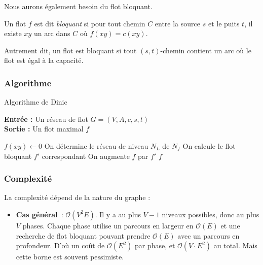 \documentclass[a4paper]{article}
\begin{document}
Nous aurons également besoin du flot bloquant.
\begin{definition}
	Un flot $f$ est dit \emph{bloquant} si pour tout chemin $C$ entre la source $s$ et le puits $t$, il existe $xy$ un arc dans $C$ où $f(xy)=c(xy)$.

	Autrement dit, un flot est bloquant si tout $(s,t)$-chemin contient un arc où le flot est égal à la capacité.
\end{definition}

\subsubsection{Algorithme}

\begin{algorithm}[H]
	\caption{Algorithme de Dinic}
	\textbf{Entrée :} Un réseau de flot $G = (V, A, c, s, t)$ \\
	\textbf{Sortie :} Un flot maximal $f$
	\begin{algorithmic}[1]
		\State $f(xy) \gets 0$
		\EndFor
		\State On détermine le réseau de niveau $N_L$ de $N_f$ 
		\State On calcule le flot bloquant $f'$ correspondant
		\State On augmente $f$ par $f'$
		\EndWhile
		\State \Return $f$
	\end{algorithmic}
\end{algorithm}
\subsubsection{Complexité}

La complexité dépend de la nature du graphe :
\begin{itemize}
    \item \textbf{Cas général} : $\mathcal{O}(V^2 E)$. Il y a au plus $V - 1$ niveaux possibles, donc au plus $V$ phases. Chaque phase utilise un parcours en largeur en $\mathcal{O}(E)$ et une recherche de flot bloquant pouvant prendre $\mathcal{O}(E)$ avec un parcours en profondeur. D’où un coût de $\mathcal{O}(E^2)$ par phase, et $\mathcal{O}(V \cdot E^2)$ au total. Mais cette borne est souvent pessimiste.
\end{itemize}
\end{document}

